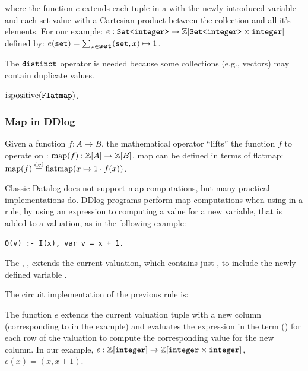 \noindent where the function $e$ extends each tuple in a \zr with the newly introduced variable
and each set value with a Cartesian product between the collection and all it's elements.
For our example: $e: \mbox{\texttt{Set<integer>}} \to \mathbb{Z}[\mbox{\texttt{Set<integer>}} \times \mbox{\texttt{integer}}]$
defined by: $e(\mbox{\texttt{set}}) = \sum_{x \in \mbox{\texttt{set}}} (\mbox{\texttt{set}}, x) \mapsto 1$.

The $\mbox{\texttt{distinct}}$ operator is needed because some collections (e.g., vectors)
may contain duplicate values.

\begin{proposition}
$\mbox{ispositive}(\mbox{\texttt{Flatmap}})$.
\end{proposition}

\subsubsection{Map in DDlog}\label{sec:map}

Given a function $f : A \rightarrow B$, the mathematical  operator ``lifts'' the
function $f$ to operate on \zrs: $\mbox{map}(f) : \mathbb{Z}[A] \rightarrow \mathbb{Z}[B]$.
map can be defined in terms of flatmap: $\mbox{map}(f) \stackrel{\textrm{\scriptsize def}}{=} \mbox{flatmap}(x \mapsto 1 \cdot f(x))$.

Classic Datalog does not support map computations, but many practical
implementations do.  DDlog programs perform map computations when using 
in a rule, by using an expression to computing a value for a new variable, that is added to a valuation,
as in the following example:

\begin{lstlisting}[language=ddlog]
O(v) :- I(x), var v = x + 1.
\end{lstlisting}

The , , extends the current valuation, which
contains just , to include the newly defined variable .

The circuit implementation of the previous rule is:


The function $e$ extends the current valuation tuple with a new column
(corresponding to  in the example) and
evaluates the expression in the term () for each row of the valuation
to compute the corresponding value for the new column.  In our example,
$e: \mathbb{Z}[\mbox{\texttt{integer}}] \to \mathbb{Z}[\mbox{\texttt{integer}} \times \mbox{\texttt{integer}}]$,
$e(x) = (x, x+1)$.

